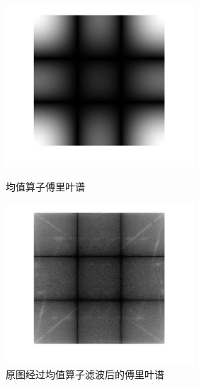 \documentclass[11pt, a4paper, UTF8]{ctexart}
\begin{document}
  \begin{figure}[H]
    \centering
    \begin{minipage}[t]{0.48\textwidth}
    \centering
    \includegraphics[width=7cm]{average.jpg}
    \caption{均值算子傅里叶谱}
    \end{minipage}
    \begin{minipage}[t]{0.48\textwidth}
    \centering
    \includegraphics[width=7cm]{average_filter.jpg}
    \caption{原图经过均值算子滤波后的傅里叶谱}
    \end{minipage}
  \end{figure}
\end{document}

